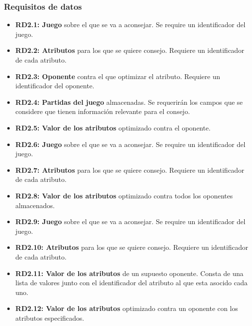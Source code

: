 \subsubsection{Requisitos de datos}

	\begin{itemize}
		\item \textbf{RD2.1: Juego} sobre el que se va a aconsejar.
			Se require un identificador del juego.

		\item \textbf{RD2.2: Atributos} para los que se quiere consejo.
			Requiere un identificador de cada atributo.

		\item \textbf{RD2.3: Oponente} contra el que optimizar el atributo.
			Requiere un identificador del oponente.

		\item \textbf{RD2.4: Partidas del juego} almacenadas.
			Se requerirán los campos que se considere que tienen información
			relevante para el consejo.

		\item \textbf{RD2.5: Valor de los atributos} optimizado contra el oponente.

		\item \textbf{RD2.6: Juego} sobre el que se va a aconsejar.
			Se require un identificador del juego.

		\item \textbf{RD2.7: Atributos} para los que se quiere consejo.
			Requiere un identificador de cada atributo.

		\item \textbf{RD2.8: Valor de los atributos} optimizado contra todos los
			oponentes almacenados.

		\item \textbf{RD2.9: Juego} sobre el que se va a aconsejar.
			Se require un identificador del juego.

		\item \textbf{RD2.10: Atributos} para los que se quiere consejo.
			Requiere un identificador de cada atributo.

		\item \textbf{RD2.11: Valor de los atributos} de un supuesto oponente.
			Consta de una lista de valores junto con el identificador del
			atributo al que esta asocido cada uno.

		\item \textbf{RD2.12: Valor de los atributos} optimizado contra un oponente 
			con los atributos especificados.
	\end{itemize}


